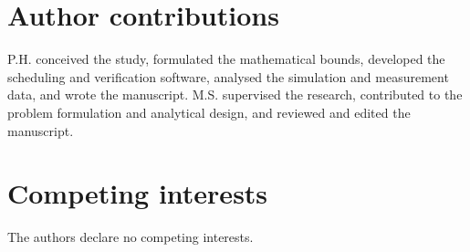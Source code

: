 \section*{Author contributions}
P.H. conceived the study, formulated the mathematical bounds, developed the scheduling and verification software, analysed the simulation and measurement data, and wrote the manuscript. M.S. supervised the research, contributed to the problem formulation and analytical design, and reviewed and edited the manuscript.

\section*{Competing interests}
The authors declare no competing interests.
